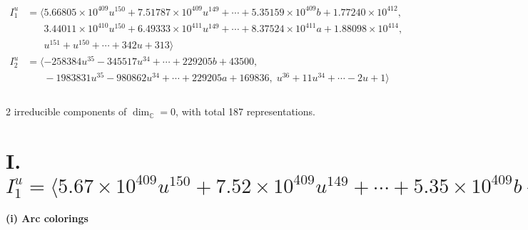 \documentclass[1p]{elsarticle_modified}
\theoremstyle{definition}
\begin{document}
\begin{align*}
I^u_{1}&=\langle 
5.66805\times10^{409} u^{150}+7.51787\times10^{409} u^{149}+\cdots+5.35159\times10^{409} b+1.77240\times10^{412},\\
\phantom{I^u_{1}}&\phantom{= \langle  }3.44011\times10^{410} u^{150}+6.49333\times10^{411} u^{149}+\cdots+8.37524\times10^{411} a+1.88098\times10^{414},\\
\phantom{I^u_{1}}&\phantom{= \langle  }u^{151}+u^{150}+\cdots+342 u+313\rangle \\
I^u_{2}&=\langle 
-258384 u^{35}-345517 u^{34}+\cdots+229205 b+43500,\\
\phantom{I^u_{2}}&\phantom{= \langle  }-1983831 u^{35}-980862 u^{34}+\cdots+229205 a+169836,\;u^{36}+11 u^{34}+\cdots-2 u+1\rangle \\
\\
\end{align*}
\raggedright * 2 irreducible components of $\dim_{\mathbb{C}}=0$, with total 187 representations.\\
\newpage
\renewcommand{\arraystretch}{1}
\centering \section*{I. $I^u_{1}= \langle 5.67\times10^{409} u^{150}+7.52\times10^{409} u^{149}+\cdots+5.35\times10^{409} b+1.77\times10^{412},\;3.44\times10^{410} u^{150}+6.49\times10^{411} u^{149}+\cdots+8.38\times10^{411} a+1.88\times10^{414},\;u^{151}+u^{150}+\cdots+342 u+313 \rangle$}
\flushleft \textbf{(i) Arc colorings}\\
\end{document}

